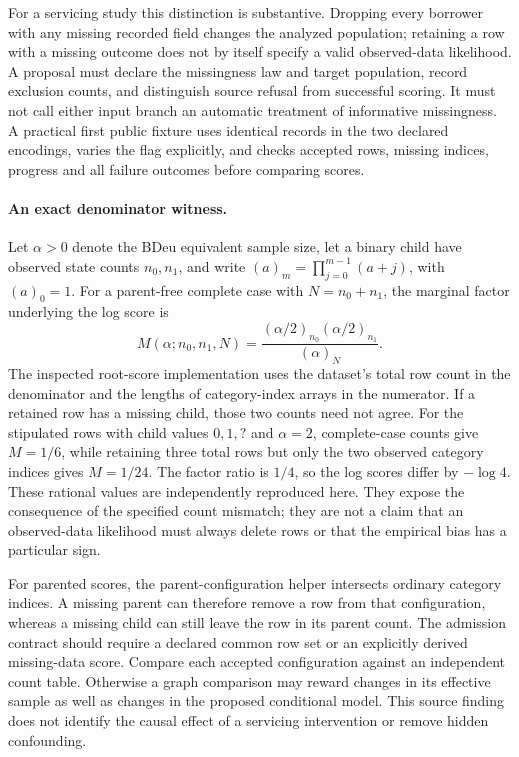 For a servicing study this distinction is substantive. Dropping every borrower with
any missing recorded field changes the analyzed population; retaining a row with a
missing outcome does not by itself specify a valid observed-data likelihood. A
proposal must declare the missingness law and target population, record exclusion
counts, and distinguish source refusal from successful scoring. It must not call
either input branch an automatic treatment of informative missingness. A practical
first public fixture uses identical records in the two declared encodings, varies
the flag explicitly, and checks accepted rows, missing indices, progress and all
failure outcomes before comparing scores.~\citep{exec28_blip_helpers}

\paragraph{An exact denominator witness.}
Let \(\alpha>0\) denote the BDeu equivalent sample size, let a binary child have
observed state counts \(n_0,n_1\), and write
\((a)_m=\prod_{j=0}^{m-1}(a+j)\), with \((a)_0=1\). For a parent-free complete
case with \(N=n_0+n_1\), the marginal factor underlying the log score is
\[
 M(\alpha;n_0,n_1,N)
 =\frac{(\alpha/2)_{n_0}(\alpha/2)_{n_1}}{(\alpha)_N}.
\]
The inspected root-score implementation uses the dataset's total row count in
the denominator and the lengths of category-index arrays in the numerator.
If a retained row has a missing child, those two counts need not agree. For the
stipulated rows with child values \(0,1,?\) and \(\alpha=2\), complete-case
counts give \(M=1/6\), while retaining three total rows but only the two observed
category indices gives \(M=1/24\). The factor ratio is \(1/4\), so the log scores
differ by \(-\log 4\). These rational values are independently reproduced here.
They expose the consequence of the specified count mismatch; they are not a claim
that an observed-data likelihood must always delete rows or that the empirical
bias has a particular sign.~\citep{exec28_blip_helpers,exec28_blip_helper_reference}

For parented scores, the parent-configuration helper intersects ordinary category
indices. A missing parent can therefore remove a row from that configuration,
whereas a missing child can still leave the row in its parent count. The admission
contract should require a declared common row set or an explicitly derived
missing-data score. Compare each accepted configuration against an independent
count table. Otherwise a graph comparison may reward changes in its effective
sample as well as changes in the proposed conditional model. This source finding
does not identify the causal effect of a servicing intervention or remove hidden
confounding.~\citep{exec28_blip_helpers}

